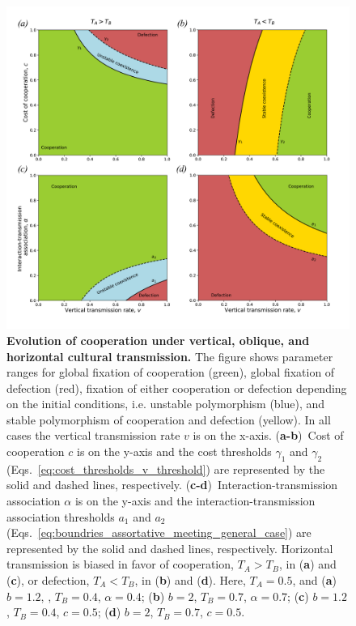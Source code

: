 \documentclass[12pt]{extarticle}
\begin{document}
\begin{figure}[p]
  \centering       
    \includegraphics[width=1\textwidth]{../PRSB_figures/fig_2.pdf}
    \caption{\textbf{Evolution of cooperation under vertical, oblique, and horizontal cultural transmission.} 
    The figure shows parameter ranges for global fixation of cooperation (green), global fixation of defection (red), fixation of either cooperation or defection depending on the initial conditions, i.e. unstable polymorphism (blue), and stable polymorphism of cooperation and defection (yellow).
	In all cases the vertical transmission rate $v$ is on the x-axis.
	(\textbf{a-b})~Cost of cooperation $c$ is on the y-axis and the cost thresholds $\gamma_1$ and $\gamma_2$ (Eqs.~\ref{eq:cost_thresholds_v_threshold}) are represented by the solid and dashed lines, respectively. 
    (\textbf{c-d})~Interaction-transmission association $\alpha$ is on the y-axis and the interaction-transmission association thresholds $a_1$ and $a_2$ (Eqs.~\ref{eq:boundries_assortative_meeting_general_case}) are represented by the solid and dashed lines, respectively. 
    Horizontal transmission is biased in favor of cooperation, $T_A>T_B$, in (\textbf{a}) and (\textbf{c}), or defection, $T_A<T_B$, in (\textbf{b}) and (\textbf{d}).    
    Here, $T_A = 0.5$, and
    (\textbf{a}) $b=1.2$, , $T_B = 0.4$, $\alpha = 0.4$;
    (\textbf{b}) $b=2$, $T_B = 0.7$, $\alpha = 0.7$;
    (\textbf{c}) $b=1.2$, $T_B = 0.4$, $c=0.5$;
    (\textbf{d}) $b=2$, $T_B = 0.7$, $c=0.5$.
    }
    \label{fig:equilibria}
\end{figure}
\end{document}

